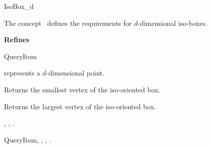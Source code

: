 

\begin{ccRefConcept}{IsoBox_d}


\ccDefinition
  
The concept \ccRefName\ defines the requirements for $d$-dimensional iso-boxes.

{\bf Refines}

QueryItem

\ccParameters

 represents a $d$-dimensional point.


\ccOperations

{Returns the smallest vertex of the iso-oriented box.}


{Returns the largest vertex of the iso-oriented box.}


\ccHasModels

, , 
.

\ccSeeAlso

QueryItem, , , 
.


\end{ccRefConcept}


